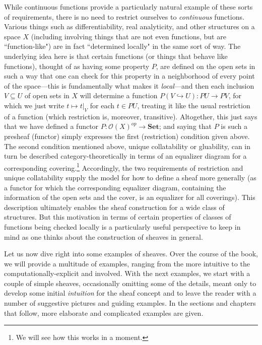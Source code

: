\documentclass[a4paper]{book}
\theoremstyle{definition}
\theoremstyle{definition}
\theoremstyle{definition}
\theoremstyle{theorem}
\theoremstyle{definition}
\begin{document}
While continuous functions provide a particularly natural example of these sorts of requirements, there is no need to restrict ourselves to \textit{continuous} functions. Various things such as differentiability, real analyticity, and other structures on a space $X$ (including involving things that are not even functions, but are ``function-like") are in fact ``determined locally" in the same sort of way. The underlying idea here is that certain functions (or things that behave like functions), thought of as having some property $P$, are defined on the open sets in such a way that one can check for this property in a neighborhood of every point of the space---this is fundamentally what makes it \textit{local}---and then each inclusion $V \subseteq U$ of open sets in $X$ will determine a function $P(V \hookrightarrow U): PU \rightarrow PV$, for which we just write $t \mapsto t|_V$ for each $t \in PU$, treating it like the usual restriction of a function (which restriction is, moreover, transitive). Altogether, this just says that we have defined a functor $P: \mathscr{O}(X)^{op} \rightarrow \textbf{Set}$; and saying that $P$ is such a presheaf (functor) simply expresses the first (restriction) condition given above. The second condition mentioned above, unique collatability or gluability, can in turn be described category-theoretically in terms of an equalizer diagram for a corresponding covering.\footnote{We will see how this works in a moment.} Accordingly, the two requirements of restriction and unique collatability supply the model for how to define a sheaf more generally (as a functor for which the corresponding equalizer diagram, containing the information of the open sets and the cover, is an equalizer for all coverings). This description ultimately enables the sheaf construction for a wide class of structures. But this motivation in terms of certain properties of classes of functions being checked locally is a particularly useful perspective to keep in mind as one thinks about the construction of sheaves in general.\par 
	Let us now dive right into some examples of sheaves. Over the course of the book, we will provide a multitude of examples, ranging from the more intuitive to the computationally-explicit and involved. With the next examples, we start with a couple of simple sheaves, occasionally omitting some of the details, meant only to develop some initial \textit{intuition} for the sheaf concept and to leave the reader with a number of suggestive pictures and guiding examples. In the sections and chapters that follow, more elaborate and complicated examples are given.
\end{document}
